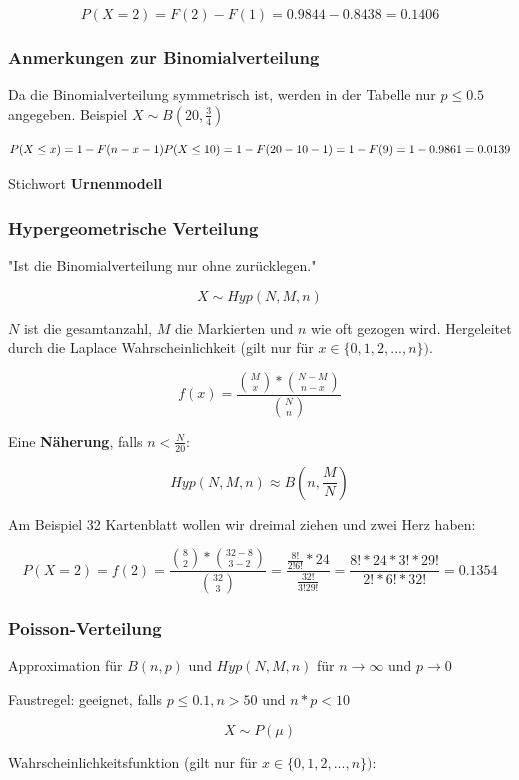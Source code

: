 \documentclass[a4paper]{article}
\begin{document}
\[
P(X=2) = F(2) - F(1) = 0.9844 - 0.8438 = 0.1406
\]

\subsubsection{Anmerkungen zur Binomialverteilung}

Da die Binomialverteilung symmetrisch ist, werden in der Tabelle nur $p\leq 0.5$ angegeben. Beispiel $X \sim B(20, \frac{3}{4})$

\[
P(X\leq x) = 1 - F(n-x-1)\\
P(X\leq 10) = 1 - F(20-10-1) = 1 - F(9) = 1 - 0.9861 = 0.0139
\]

Stichwort \textbf{Urnenmodell}

\subsubsection{Hypergeometrische Verteilung}

"Ist die Binomialverteilung nur ohne zurücklegen."

\[
X \sim Hyp(N, M, n)
\]

$N$ ist die gesamtanzahl, $M$ die Markierten und $n$ wie oft gezogen wird. Hergeleitet durch die Laplace Wahrscheinlichkeit (gilt nur für $x\in\{0, 1, 2, ..., n\})$.

\[
f(x) = \frac{\binom{M}{x} * \binom{N-M}{n-x}}{\binom{N}{n}}
\]

Eine \textbf{Näherung}, falls $n < \frac{N}{20}$:

\[
Hyp(N, M, n) \approx B(n, \frac{M}{N})
\]

Am Beispiel 32 Kartenblatt wollen wir dreimal ziehen und zwei Herz haben:

\[
P(X=2) = f(2) = \frac{\binom{8}{2}*\binom{32-8}{3-2}}{\binom{32}{3}} = \frac{\frac{8!}{2!6!}*24}{\frac{32!}{3!29!}} = \frac{8!*24*3!*29!}{2!*6!*32!} = 0.1354
\]

\subsubsection{Poisson-Verteilung}

Approximation für $B(n,p)$ und $Hyp(N, M, n)$ für $n\to\infty$ und $p\to 0$

Faustregel: geeignet, falls $p\leq 0.1, n > 50$ und $n*p < 10$

\[
X \sim P(\mu)
\]

Wahrscheinlichkeitsfunktion (gilt nur für $x\in\{0, 1, 2, ..., n\})$:
\end{document}
